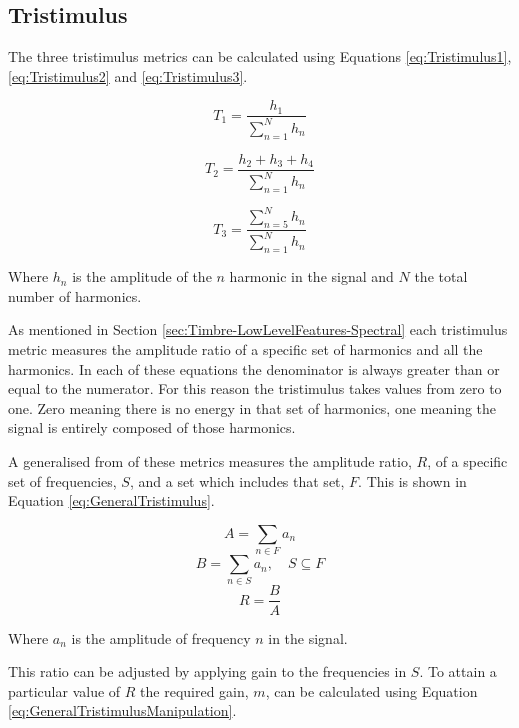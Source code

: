 	\subsection{Tristimulus}
	\label{sec:FeatureControl-Parameterisation-Tristimulus}
		The three tristimulus metrics can be calculated using Equations \ref{eq:Tristimulus1}, \ref{eq:Tristimulus2}
		and \ref{eq:Tristimulus3}.
		
		\begin{equation}
			T_{1} = \frac{h_{1}}{\sum_{n = 1}^{N} h_{n}}
			\label{eq:Tristimulus1}
		\end{equation}

		\begin{equation}
			T_{2} = \frac{h_{2} + h_{3} + h_{4}}{\sum_{n = 1}^{N} h_{n}}
			\label{eq:Tristimulus2}
		\end{equation}

		\begin{equation}
			T_{3} = \frac{\sum_{n = 5}^{N} h_{n}}{\sum_{n = 1}^{N} h_{n}}
			\label{eq:Tristimulus3}
		\end{equation}

		Where $h_{n}$ is the amplitude of the $n$ harmonic in the signal and $N$ the total number of
		harmonics.

		As mentioned in Section \ref{sec:Timbre-LowLevelFeatures-Spectral} each tristimulus metric measures the
		amplitude ratio of a specific set of harmonics and all the harmonics. In each of these equations the
		denominator is always greater than or equal to the numerator. For this reason the tristimulus takes values
		from zero to one. Zero meaning there is no energy in that set of harmonics, one meaning the signal is
		entirely composed of those harmonics.

		A generalised from of these metrics measures the amplitude ratio, $R$, of a specific set of frequencies,
		$S$, and a set which includes that set, $F$. This is shown in Equation \ref{eq:GeneralTristimulus}.

		\[ A = \sum_{n \in F} a_{n} \]
		\[ B = \sum_{n \in S} a_{n}, \quad S \subseteq F \]
		\begin{equation}
			R = \frac{B}{A}
			\label{eq:GeneralTristimulus}
		\end{equation}

		Where $a_{n}$ is the amplitude of frequency $n$ in the signal.

		This ratio can be adjusted by applying gain to the frequencies in $S$. To attain a particular value of $R$
		the required gain, $m$, can be calculated using Equation \ref{eq:GeneralTristimulusManipulation}.

